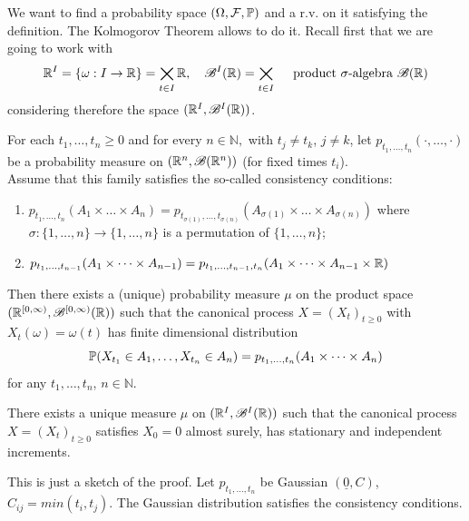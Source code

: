 \documentclass[crop=false, class=article]{standalone}
\begin{document}
	We want to find a probability space $(\Omega, \mathcal{F}, \mathbb{P})$ and a r.v. on it satisfying the definition. The Kolmogorov Theorem allows to do it. Recall first that we are going to work with 
	\begin{equation*}
		\mathbb{R}^I = \{\omega: I \to \mathbb{R}\} = \bigtimes _{t \in I} \mathbb{R}, \quad \mathscr{B}^I(\mathbb{R}) = \bigtimes_{t \in I} \quad \text{ product $\sigma$-algebra }
		\mathscr{B}(\mathbb{R})
	\end{equation*}
	considering therefore the space $(\mathbb{R}^I, \mathscr{B}^I(\mathbb{R}))$.
	\begin{theorem}
		For each $t_1, \dots, t_n \geq 0$ and for every $n \in \mathbb{N}, $ with $t_j \neq t_k$, $j \neq k$, let $p_{t_1, \dots, t_n}(\cdot, \dots, \cdot)$ be a probability measure on $(\mathbb{R}^n, \mathscr{B}(\mathbb{R}^n))$ (for fixed times $t_i$). \\
		Assume that this family satisfies the so-called consistency conditions:
		\begin{enumerate}
			\item $p_{t_1, \dots, t_n}(A_1 \times  \dots \times  A_n) = p_{t_{\sigma(1)}, \dots, t_{\sigma(n)}}(A_{\sigma(1)} \times  \dots \times  A_{\sigma(n)})$ where $\sigma:\{1, \dots, n\} \to \{1, \dots, n\} $ is a permutation of $\{1, \ldots, n\}$;
			\item $p_{t_1, \dots, t_{n-1}}(A_1\times  \dots \times  A_{n-1}) =p_{t_1, \dots, t_{n-1}, t_n}(A_1\times  \dots \times  A_{n-1}\times \mathbb{R}) $
		\end{enumerate}
		Then there exists a (unique) probability measure $\mu$ on the product space $(\mathbb{R}^{[0,\infty)}, \mathscr{B}^{[0,\infty)}(\mathbb{R}))$ such that the canonical process $X=(X_t)_{t \geq 0}$ with $X_t(\omega)= \omega(t)$ has finite dimensional distribution 
		\begin{equation*}
			\mathbb{P}(X_{t_1}\in A_1, \dots, X_{t_n} \in A_n)= p_{t_1, \dots, t_n}(A_1 \times \dots \times  A_n)
		\end{equation*}
		for any $t_1, \dots, t_n$, $n \in \mathbb{N}$.
	\end{theorem}
	\begin{corollary}
		There exists a unique measure $\mu$ on $(\mathbb{R}^I,\mathscr{B}^I(\mathbb{R}) )$ such that the canonical process $X=(X_t)_{t \geq 0}$ satisfies $X_0=0$ almost surely, has  stationary and independent increments. 
	\end{corollary}
	\begin{fancyproof}
		This is just a sketch of the proof.
		Let $p_{t_1, \dots, t_n}$ be Gaussian $(\underline{0}, C)$, $C_{ij}= min(t_i, t_j)$. The Gaussian distribution satisfies the consistency conditions. 
	\end{fancyproof}
\end{document}
